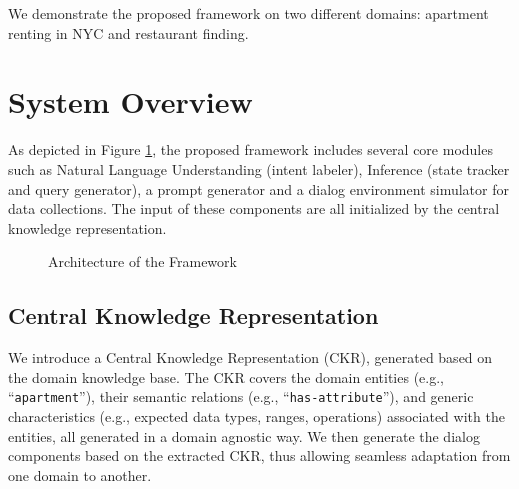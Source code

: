 \documentclass[letterpaper]{article} %
\begin{document}
We demonstrate the proposed framework on two different domains: apartment renting in NYC and restaurant finding.

\section{System Overview}
As depicted in Figure \ref{fig:system}, the proposed framework includes several core modules such as Natural Language Understanding (intent labeler), Inference (state tracker and query generator), a prompt generator and a dialog environment simulator for data collections. The input of these components are all initialized by the central knowledge representation.

\begin{figure}[!ht]
    \centering
    \caption{Architecture of the Framework}
    \label{fig:system}
\end{figure}


\subsection{Central Knowledge Representation} 
We introduce a Central Knowledge Representation (CKR), generated based on the domain knowledge base.  
The CKR covers the domain entities (e.g., ``\texttt{apartment}''), their semantic relations (e.g., ``\texttt{has-attribute}''),
and generic characteristics (e.g., expected data types, ranges, operations) associated with the entities, all generated in a domain agnostic way. We then generate the dialog components based on the extracted CKR, thus allowing seamless adaptation from one domain to another. 
\end{document}

